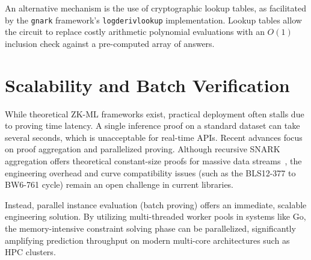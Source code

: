 An alternative mechanism is the use of cryptographic lookup tables, as facilitated by the \texttt{gnark} framework's \texttt{logderivlookup} implementation. Lookup tables allow the circuit to replace costly arithmetic polynomial evaluations with an $O(1)$ inclusion check against a pre-computed array of answers.

\section{Scalability and Batch Verification}
While theoretical ZK-ML frameworks exist, practical deployment often stalls due to proving time latency. A single inference proof on a standard dataset can take several seconds, which is unacceptable for real-time APIs. Recent advances focus on proof aggregation and parallelized proving. Although recursive SNARK aggregation offers theoretical constant-size proofs for massive data streams~\cite{cryptoeprint:2023/1174}, the engineering overhead and curve compatibility issues (such as the BLS12-377 to BW6-761 cycle) remain an open challenge in current libraries.

Instead, parallel instance evaluation (batch proving) offers an immediate, scalable engineering solution. By utilizing multi-threaded worker pools in systems like Go, the memory-intensive constraint solving phase can be parallelized, significantly amplifying prediction throughput on modern multi-core architectures such as HPC clusters.
